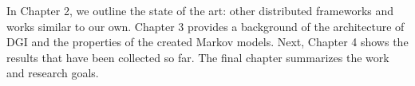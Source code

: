 In Chapter 2, we outline the state of the art: other distributed frameworks and works similar to our own. Chapter 3 provides a background of the architecture of DGI and the properties of the created Markov models. Next, Chapter 4 shows the results that have been collected so far. The final chapter summarizes the work and research goals.
